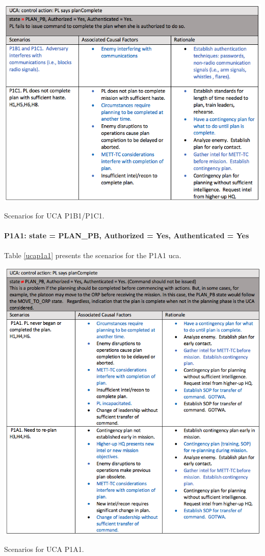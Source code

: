 \documentclass[../../main/main.tex]{subfiles}
\begin{document}
\begin{table}[ht!]
\begin{center}
\includegraphics[width=\linewidth]{../figures/ucap1b1p1c1}
\caption{Scenarios for UCA P1B1/P1C1.}
\label{ucap1b1p1c1}
\end{center}
\end{table}
\clearpage

\paragraph*{P1A1: state  = PLAN_PB, Authorized = Yes, Authenticated = Yes}
Table \ref{ucap1a1} presents the scenarios for the P1A1 \gls{uca}.

\begin{table}[ht!]
\begin{center}
\includegraphics[width=\linewidth]{../figures/ucap1a1}
\caption{Scenarios for UCA P1A1.}
\label{ucap1a1}
\end{center}
\end{table}
\clearpage
\end{document}
